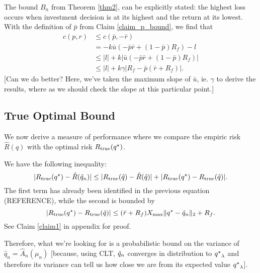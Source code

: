 \documentclass[11pt]{article}
\begin{document}
The bound $B_n$ from Theorem \ref{thm2}, can be explicitly stated: the highest loss occurs
when investment decision is at its highest and the return at its lowest. With the
definition of $\bar p$ from Claim \ref{claim_p_bound}, we find that
\begin{align*}
  c(p,r) &\leq c(\bar p,-\bar r)\\
         &= -k\bar u(-\bar p\bar r+(1-\bar p)R_f) - l\\
         &\leq |l| + k|\bar u(-\bar p\bar r+(1-\bar p)R_f)|\\
         &\leq |l| + k\gamma|R_f - \bar p(\bar r + R_f)|.
\end{align*}
[Can we do better? Here, we've taken the maximum slope of $\bar u$, ie. $\gamma$ to derive
the results, where as we should check the slope at this particular point.]

\subsection{True Optimal Bound}

We now derive a measure of performance where we compare the empiric risk $\hat R(\hat q)$
with the optimal risk $R_{\mathrm{true}}({q^\star})$.

We have the following inequality:
\begin{equation*}
  |R_{\mathrm{true}}({q^\star}) - \hat R({\hat q}_n)| \leq |R_{\mathrm{true}}(\hat q) - \hat R(\hat q)| +
  |R_{\mathrm{true}}({q^\star}) - R_{\mathrm{true}}(\hat q)|.
\end{equation*}
The first term has already been identified in the previous equation (REFERENCE), while the
second is bounded by
\begin{equation*}
  |R_{\mathrm{true}}({q^\star}) - R_{\mathrm{true}}(\hat q)| \leq (\bar r +R_f)X_{\max}\|{q^\star} - {\hat q}_n\|_2 + R_f.
\end{equation*}
See Claim \ref{claim1} in appendix for proof. 

Therefore, what we're looking for is a probabilistic bound on the variance of
$\hat q_n = \hat A_n(\mu_n)$ [because, using CLT, ${\hat q}_n$ converges in distribution to
${q^\star}_\lambda$ and therefore its variance can tell us how close we are from its expected
value ${q^\star}_\lambda$].

\newpage
\end{document}
